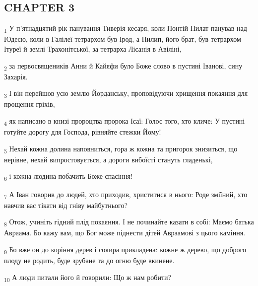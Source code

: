 \subsection{CHAPTER 3}
\begin{tcolorbox}
\textsubscript{1} У п'ятнадцятий рік панування Тиверія кесаря, коли Понтій Пилат панував над Юдеєю, коли в Галілеї тетрархом був Ірод, а Пилип, його брат, був тетрархом Ітуреї й землі Трахонітської, за тетрарха Лісанія в Авіліні,
\end{tcolorbox}
\begin{tcolorbox}
\textsubscript{2} за первосвящеників Анни й Кайяфи було Боже слово в пустині Іванові, сину Захарія.
\end{tcolorbox}
\begin{tcolorbox}
\textsubscript{3} І він перейшов усю землю Йорданську, проповідуючи хрищення покаяння для прощення гріхів,
\end{tcolorbox}
\begin{tcolorbox}
\textsubscript{4} як написано в книзі пророцтва пророка Ісаї: Голос того, хто кличе: У пустині готуйте дорогу для Господа, рівняйте стежки Йому!
\end{tcolorbox}
\begin{tcolorbox}
\textsubscript{5} Нехай кожна долина наповниться, гора ж кожна та пригорок знизиться, що нерівне, нехай випростовується, а дороги вибоїсті стануть гладенькі,
\end{tcolorbox}
\begin{tcolorbox}
\textsubscript{6} і кожна людина побачить Боже спасіння!
\end{tcolorbox}
\begin{tcolorbox}
\textsubscript{7} А Іван говорив до людей, хто приходив, христитися в нього: Роде зміїний, хто навчив вас тікати від гніву майбутнього?
\end{tcolorbox}
\begin{tcolorbox}
\textsubscript{8} Отож, учиніть гідний плід покаяння. І не починайте казати в собі: Маємо батька Авраама. Бо кажу вам, що Бог може піднести дітей Авраамові з цього каміння.
\end{tcolorbox}
\begin{tcolorbox}
\textsubscript{9} Бо вже он до коріння дерев і сокира прикладена: кожне ж дерево, що доброго плоду не родить, буде зрубане та до огню буде вкинене.
\end{tcolorbox}
\begin{tcolorbox}
\textsubscript{10} А люди питали його й говорили: Що ж нам робити?
\end{tcolorbox}
